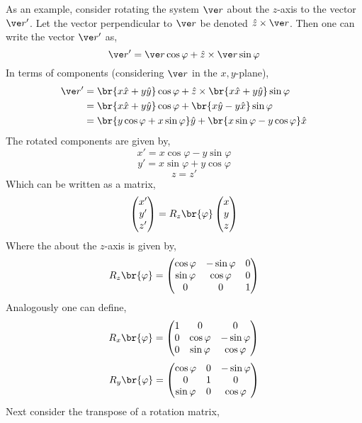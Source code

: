 \documentclass{article}
\begin{document}
As an example, consider rotating the system $\ve r$ about the $z$-axis to the vector $\ve r'$. Let the vector perpendicular to $\ve r$ be denoted $\hat z \times \ve r$. Then one can write the vector $\ve r'$ as,
\[ \ve r' = \ve r \cos \varphi + \hat z \times \ve r \sin \varphi \]
In terms of components (considering $\ve r$ in the $x,y$-plane),
\begin{align*}
\ve r' &= \br{x \hat x + y \hat y} \cos \varphi + \hat z \times \br{x \hat x + y \hat y} \sin \varphi \\
&= \br{x \hat x + y \hat y} \cos \varphi + \br{x \hat y - y \hat x} \sin \varphi \\
&= \br{y\cos \varphi + x\sin \varphi} \hat y + \br{x\sin \varphi - y\cos \varphi} \hat x
\end{align*}
The rotated components are given by,
\[ x' = x \cos \varphi - y \sin \varphi  \]
\[ y' = x \sin \varphi + y \cos \varphi  \]
\[ z = z' \]
Which can be written as a matrix,
\[ \begin{pmatrix}x'\\y'\\z'\end{pmatrix} = R_{z}\br{\varphi} \begin{pmatrix}x\\y\\z\end{pmatrix} \]
Where the  about the $z$-axis is given by,
\[ R_{z}\br{\varphi} = \begin{pmatrix}
    \cos \varphi & - \sin \varphi & 0 \\
    \sin \varphi & \cos \varphi & 0 \\
    0 & 0 & 1 \\
\end{pmatrix} \]
Analogously one can define,
\[ R_{x}\br{\varphi} = \begin{pmatrix}
    1 & 0 & 0 \\
    0 & \cos \varphi & - \sin \varphi \\
    0 & \sin \varphi & \cos \varphi \\
\end{pmatrix} \]
\[ R_{y}\br{\varphi} = \begin{pmatrix}
    \cos \varphi & 0 & - \sin \varphi \\
    0 & 1 & 0 \\
    \sin \varphi & 0 & \cos \varphi \\
\end{pmatrix} \]
Next consider the transpose of a rotation matrix,
\end{document}
